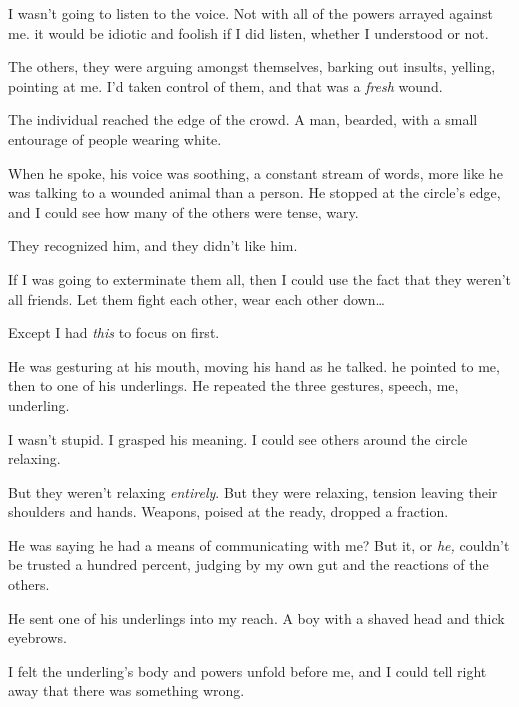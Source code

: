 I wasn't going to listen to the voice. Not with all of the powers arrayed against me.  it would be idiotic and foolish if I did listen, whether I understood or not.



The others, they were arguing amongst themselves, barking out insults, yelling, pointing at me.  I'd taken control of them, and that was a \emph{fresh} wound.



The individual reached the edge of the crowd.  A man, bearded, with a small entourage of people wearing white.



When he spoke, his voice was soothing, a constant stream of words, more like he was talking to a wounded animal than a person.  He stopped at the circle's edge, and I could see how many of the others were tense, wary.



They recognized him, and they didn't like him.



If I was going to exterminate them all, then I could use the fact that they weren't all friends.  Let them fight each other, wear each other down\ldots



Except I had \emph{this} to focus on first.



He was gesturing at his mouth, moving his hand as he talked.  he pointed to me, then to one of his underlings.  He repeated the three gestures, speech, me, underling.



I wasn't stupid.  I grasped his meaning.  I could see others around the circle relaxing.



But they weren't relaxing \emph{entirely}.  But they were relaxing, tension leaving their shoulders and hands.  Weapons, poised at the ready, dropped a fraction.



He was saying he had a means of communicating with me?  But it, or \emph{he, }couldn't be trusted a hundred percent, judging by my own gut and the reactions of the others.



He sent one of his underlings into my reach.  A boy with a shaved head and thick eyebrows.



I felt the underling's body and powers unfold before me, and I could tell right away that there was something wrong.



